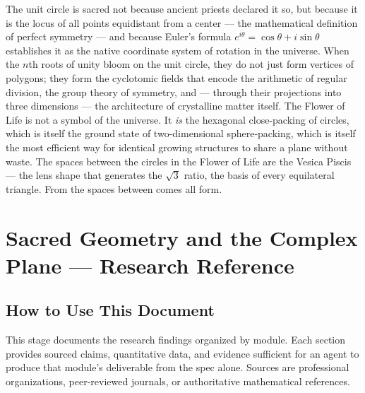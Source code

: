 \documentclass[11pt,letterpaper]{article}
\newcommand{\stageheader}[2]{%
  \noindent\colorbox{#2}{\makebox[\textwidth][l]{%
    \textcolor{white}{\bfseries\sffamily\hspace{6pt}#1\hspace{6pt}}}}%
  \vspace{0.5em}\par%
}
\begin{document}
The unit circle is sacred not because ancient priests declared it so, but because it is the locus of all points equidistant from a center --- the mathematical definition of perfect symmetry --- and because Euler's formula $e^{i\theta} = \cos\theta + i\sin\theta$ establishes it as the native coordinate system of rotation in the universe. When the $n$th roots of unity bloom on the unit circle, they do not just form vertices of polygons; they form the cyclotomic fields that encode the arithmetic of regular division, the group theory of symmetry, and --- through their projections into three dimensions --- the architecture of crystalline matter itself. The Flower of Life is not a symbol of the universe. It \textit{is} the hexagonal close-packing of circles, which is itself the ground state of two-dimensional sphere-packing, which is itself the most efficient way for identical growing structures to share a plane without waste. The spaces between the circles in the Flower of Life are the Vesica Piscis --- the lens shape that generates the $\sqrt{3}$ ratio, the basis of every equilateral triangle. From the spaces between comes all form.

\newpage
\stageheader{STAGE 2 --- RESEARCH REFERENCE}{secondary}

\section{Sacred Geometry and the Complex Plane --- Research Reference}

\subsection{How to Use This Document}

This stage documents the research findings organized by module. Each section provides sourced claims, quantitative data, and evidence sufficient for an agent to produce that module's deliverable from the spec alone. Sources are professional organizations, peer-reviewed journals, or authoritative mathematical references.
\end{document}
